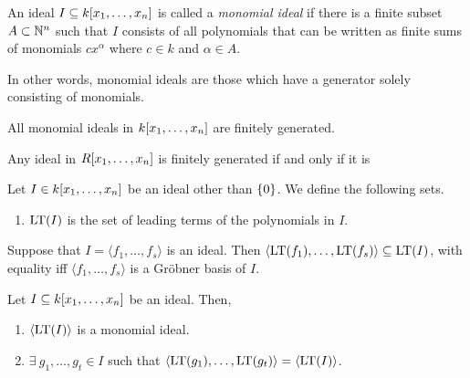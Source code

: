 \documentclass[twoside]{article}
\begin{document}
\begin{definition}
    An ideal \(I \subseteq k[x_1, \ldots, x_n]\) is called a
    \emph{monomial ideal} if there is a finite subset \(A \subset \mathbb N^n\) such
    that \(I\) consists of all polynomials that can be written as finite sums of
    monomials \(c x^\alpha\) where \(c \in k\) and \(\alpha \in A\).
\end{definition}

In other words, monomial ideals are those which have a generator solely
consisting of monomials.

\begin{lemma}
    All monomial ideals in \(k[x_1, \ldots, x_n]\) are finitely generated.
\end{lemma}

\begin{theorem}
    Any ideal in \(R[x_1, \ldots, x_n]\) is finitely generated if and only
    if it is 
\end{theorem}

\begin{definition}
    Let \(I \in k[x_1, \ldots, x_n]\) be an ideal other than
    \(\{0\}\). We define the following sets.
    \begin{enumerate}
        \item \(\mathrm{LT}(I)\) is the set of leading terms of the
        polynomials in \(I\).
    \end{enumerate}
\end{definition}

Suppose that \(I = \langle f_1, \ldots, f_s \rangle\) is an ideal. Then
\(\langle \mathrm{LT}(f_1), \ldots, \mathrm{LT}(f_s) \rangle \subseteq
\mathrm{LT}(I)\), with equality iff \(\langle f_1, \ldots, f_s \rangle\) is
a Gr\"{o}bner basis of \(I\).

\begin{proposition}
    Let \(I \subseteq k[x_1, \ldots, x_n]\) be an ideal. Then,
    \begin{enumerate}
        \item \(\langle \mathrm{LT}(I) \rangle\) is a monomial ideal.
        \item \(\exists\ g_1, \ldots, g_t \in I\) such that
        \(\langle \mathrm{LT}(g_1), \ldots, \mathrm{LT}(g_t) \rangle =
        \langle \mathrm{LT}(I) \rangle\).
    \end{enumerate}
\end{proposition}
\end{document}
